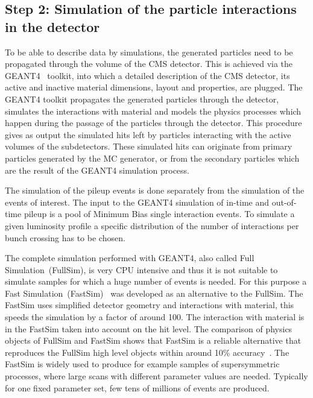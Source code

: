 \subsection{Step 2: Simulation of the particle interactions in the detector}

To be able to describe data by simulations, the generated particles need to be propagated through the volume of the CMS detector. This is achieved via the GEANT4~\cite{Agostinelli:2002hh, Lefebure:1999wja} toolkit, into which a detailed description of the CMS detector, its active and inactive material dimensions, layout and properties, are plugged. The GEANT4 toolkit propagates the generated particles through the detector, simulates the interactions with material and models the physics processes which happen during the passage of the particles through the detector. This procedure gives as output the simulated hits left by particles interacting with the active volumes of the subdetectors. These simulated hits can originate from primary particles generated by the MC generator, or from the secondary particles which are the result of the GEANT4 simulation process.

The simulation of the pileup events is done separately from the simulation of the events of interest. The input to the GEANT4 simulation of in-time and out-of-time pileup is a pool of Minimum Bias single interaction events. To simulate a given luminosity profile a specific distribution of the number of interactions per bunch crossing has to be chosen. 


The complete simulation performed with GEANT4, also called Full Simulation~(FullSim), is very CPU intensive and thus it is not suitable to simulate samples for which a huge number of events is needed. For this purpose a Fast Simulation~(FastSim)~\cite{Sekmen:2017hzs, CMS:2010spa, Giammanco:2014bza} was developed as an alternative to the FullSim. The FastSim uses simplified detector geometry and interactions with material, this speeds the simulation by a factor of around 100. The interaction with material is in the FastSim taken into account on the hit level. The comparison of physics objects of FullSim and FastSim shows that FastSim is a reliable alternative that reproduces the FullSim high level objects within around 10\% accuracy~\cite{Sekmen:2017hzs, Abdullin:2011zz}. The FastSim is widely used to produce for example samples of supersymmetric processes, where large scans with different parameter values are needed. Typically for one fixed parameter set, few tens of millions of events are produced.

